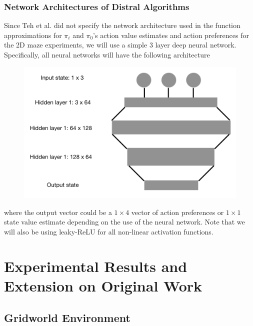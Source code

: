 \documentclass[12pt]{report}
\begin{document}
\subsection{Network Architectures of Distral Algorithms}

Since Teh et al. \cite{teh2017distral} did not specify the network architecture used in the function approximations for $\pi_i$ and $\pi_0$'s action value estimates and action preferences for the 2D maze experiments, we will use a simple 3 layer deep neural network. Specifically, all neural networks will have the following architecture
\begin{figure}[H]
    \center
    \includegraphics[width=0.6\linewidth]{figs/nn_architecture.png}
    \label{fig:nn_arch}
\end{figure}
where the output vector could be a $1 \times 4$ vector of action preferences or $1 \times 1$ state value estimate depending on the use of the neural network. Note that we will also be using leaky-ReLU for all non-linear activation functions.

\chapter{Experimental Results and Extension on Original Work}
\section{Gridworld Environment}
\end{document}
